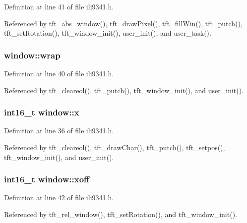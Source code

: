 Definition at line 41 of file ili9341.\-h.



Referenced by tft\-\_\-abs\-\_\-window(), tft\-\_\-draw\-Pixel(), tft\-\_\-fill\-Win(), tft\-\_\-putch(), tft\-\_\-set\-Rotation(), tft\-\_\-window\-\_\-init(), user\-\_\-init(), and user\-\_\-task().

\hypertarget{structwindow_aee853dc29d3cf708890faff063ce9afb}{
\subsubsection[{wrap}]{ window\-::wrap}}\label{structwindow_aee853dc29d3cf708890faff063ce9afb}


Definition at line 40 of file ili9341.\-h.



Referenced by tft\-\_\-cleareol(), tft\-\_\-putch(), tft\-\_\-window\-\_\-init(), and user\-\_\-init().

\hypertarget{structwindow_a879b99940dfc34772f0257f54c67b817}{
\subsubsection[{x}]{\setlength{\rightskip}{0pt plus 5cm}int16\-\_\-t window\-::x}}\label{structwindow_a879b99940dfc34772f0257f54c67b817}


Definition at line 36 of file ili9341.\-h.



Referenced by tft\-\_\-cleareol(), tft\-\_\-draw\-Char(), tft\-\_\-putch(), tft\-\_\-setpos(), tft\-\_\-window\-\_\-init(), and user\-\_\-init().

\hypertarget{structwindow_a12d0408f393bc8d23cc3f1ce46c39879}{
\subsubsection[{xoff}]{\setlength{\rightskip}{0pt plus 5cm}int16\-\_\-t window\-::xoff}}\label{structwindow_a12d0408f393bc8d23cc3f1ce46c39879}


Definition at line 42 of file ili9341.\-h.



Referenced by tft\-\_\-rel\-\_\-window(), tft\-\_\-set\-Rotation(), and tft\-\_\-window\-\_\-init().

